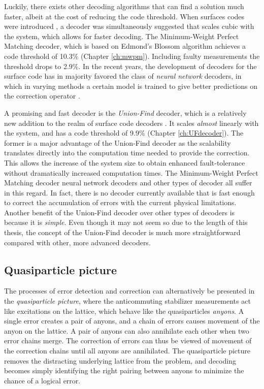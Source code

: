 Luckily, there exists other decoding algorithms that can find a solution much faster, albeit at the cost of reducing the code threshold. When surfaces codes were introduced \cite{dennis2002topological}, a decoder was simultaneously suggested that scales cubic with the system, which allows for faster decoding. The Minimum-Weight Perfect Matching decoder, which is based on Edmond's Blossom algorithm achieves a code threshold of 10.3\% (Chapter \ref{ch:mwpm}). Including faulty measurements the threshold drops to 2.9\%. In the recent years, the development of decoders for the surface code has in majority favored the class of \emph{neural network} decoders, in which in varying methods a certain model is trained to give better predictions on the correction operator \cite{breuckmann2018scalable, nautrup2019optimizing, varsamopoulos2017decoding, varsamopoulos2020decoding}. 

A promising and fast decoder is the \emph{Union-Find} decoder, which is a relatively new addition to the realm of surface code decoders \cite{delfosse2017almost}. It scales \emph{almost} linearly with the system, and has a code threshold of 9.9\% (Chapter \ref{ch:UFdecoder}). The former is a major advantage of the Union-Find decoder as the scalability translates directly into the computation time needed to provide the correction. This allows the increase of the system size to obtain enhanced fault-tolerance without dramatically increased computation times. The Minimum-Weight Perfect Matching decoder neural network decoders and other types of decoder all suffer in this regard. In fact, there is no decoder currently available that is fast enough to correct the accumulation of errors with the current physical limitations. Another benefit of the Union-Find decoder over other types of decoders is because it is \emph{simple}. Even though it may not seem so due to the length of this thesis, the concept of the Union-Find decoder is much more straightforward compared with other, more advanced decoders. 

\subsection{Quasiparticle picture}\label{sec:quasiparticle}
The processes of error detection and correction can alternatively be presented in the \emph{quasiparticle picture}, where the anticommuting stabilizer measurements act like excitations on the lattice, which behave like the quasiparticles \emph{anyons}. A single error creates a pair of anyons, and a chain of errors causes movement of the anyon on the lattice. A pair of anyons can also annihilate each other when two error chains merge. The correction of errors can thus be viewed of movement of the correction chains until all anyons are annihilated. The quasiparticle picture removes the distracting underlying lattice from the problem, and decoding becomes simply identifying the right pairing between anyons to minimize the chance of a logical error.


